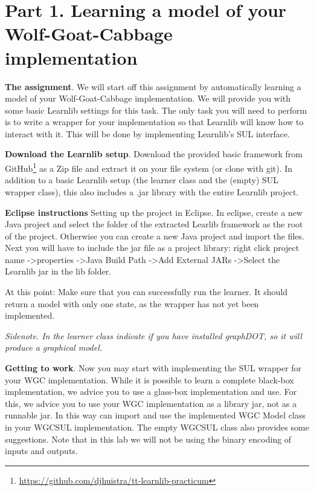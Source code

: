 \documentclass[a4paper]{article}
\begin{document}
\section*{Part 1. Learning a model of your Wolf-Goat-Cabbage implementation}

\textbf{The assignment}. We will start off this assignment by automatically learning a model of your Wolf-Goat-Cabbage implementation. We will provide you with some basic Learnlib settings for this task. The only task you will need to perform is to write a wrapper for your implementation so that Learnlib will know how to interact with it.  This will be done by implementing Learnlib's SUL interface.

\textbf{Download the Learnlib setup}. Download the provided basic framework from GitHub\footnote{\url{https://github.com/djhuistra/tt-learnlib-practicum}} as a Zip file and extract it on your file system (or clone with git). In addition to a basic Learnlib setup (the learner class and the (empty) SUL wrapper class), this also includes a .jar library with the entire Learnlib project.

\textbf{Eclipse instructions} Setting up the project in Eclipse. In eclipse, create a new Java project and select the folder of the extracted Learlib framework as the root of the project. Otherwise you can create a new Java project and import the files. Next you will have to include the jar file as a project library: right click project name  -\textgreater properties  -\textgreater Java Build Path -\textgreater Add External JARs -\textgreater Select the Learnlib jar in the lib folder.

\medskip
At this point: Make sure that you can successfully run the learner. It should return a model with only one state, as the wrapper has not yet been implemented.

\emph{Sidenote. In the learner class indicate if you have installed graphDOT, so it will produce a graphical model.}

\medskip
\textbf{Getting to work}. Now you may start with implementing the SUL wrapper for your WGC implementation. While it is possible to learn a complete black-box implementation, we advice you to use a glass-box implementation and use. For this, we advice you to use your WGC implementation as a library jar, not as a runnable jar. In this way can import and use the implemented WGC Model class in your WGCSUL implementation. The empty WGCSUL class also provides some suggestions. Note that in this lab we will not be using the binary encoding of inputs and outputs. 
\end{document}
